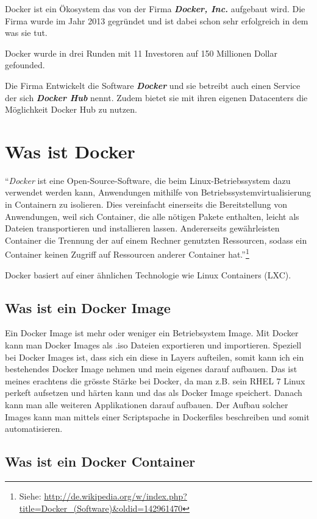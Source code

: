 Docker ist ein Ökosystem das von der Firma \textbf{\textit{Docker, Inc.}} aufgebaut wird.
Die Firma wurde im Jahr 2013 gegründet und ist dabei schon sehr erfolgreich in dem was sie tut.

Docker wurde in drei Runden mit 11 Investoren auf 150 Millionen Dollar gefounded.

Die Firma Entwickelt die Software \textbf{\textit{Docker}} und sie betreibt auch einen Service der sich
\textbf{\textit{Docker Hub}} nennt. Zudem bietet sie mit ihren eigenen Datacenters die Möglichkeit
Docker Hub zu nutzen.

\section{Was ist Docker}

“\textit{Docker} ist eine Open-Source-Software, die beim Linux-Betriebssystem dazu verwendet werden
kann, Anwendungen mithilfe von Betriebssystemvirtualisierung in Containern zu isolieren.
Dies vereinfacht einerseits die Bereitstellung von Anwendungen, weil sich Container, die
alle nötigen Pakete enthalten, leicht als Dateien transportieren und installieren lassen.
Andererseits gewährleisten Container die Trennung der auf einem Rechner genutzten Ressourcen,
sodass ein Container keinen Zugriff auf Ressourcen anderer Container hat.”\footnote{Siehe: \url{http://de.wikipedia.org/w/index.php?title=Docker_(Software)&oldid=142961470}}

Docker basiert auf einer ähnlichen Technologie wie Linux Containers (LXC).

\subsection{Was ist ein Docker Image}

Ein Docker Image ist mehr oder weniger ein Betriebsystem Image. Mit Docker kann man Docker Images
als .iso Dateien exportieren und importieren. Speziell bei Docker Images ist, dass sich ein diese
in Layers aufteilen, somit kann ich ein bestehendes Docker Image nehmen und mein eigenes darauf
aufbauen. Das ist meines erachtens die grösste Stärke bei Docker, da man z.B. sein RHEL 7 Linux
perkeft aufsetzen und härten kann und das als Docker Image speichert. Danach kann man alle
weiteren Applikationen darauf aufbauen. Der Aufbau solcher Images kann man mittels einer
Scriptspache in Dockerfiles beschreiben und somit automatisieren.

\subsection{Was ist ein Docker Container}

